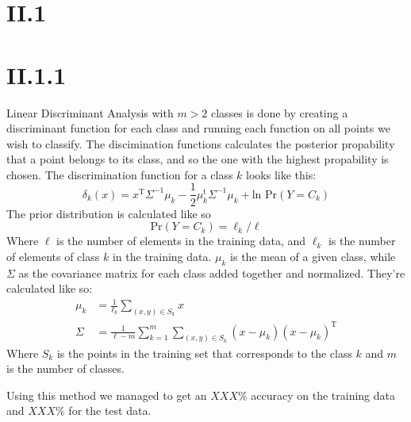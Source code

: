 \section*{II.1}

\section*{II.1.1}
Linear Discriminant Analysis with $m>2$ classes is done by creating a
discriminant function for each class and running each function on all points we
wish to classify. The discimination functions calculates the posterior
propability that a point belongs to its class, and so the one with the highest
propability is chosen.
The discrimination function for a class $k$ looks like this:
\[
  \delta_k(x) = x^\text{T}\Sigma^{-1}\mu_k - \frac{1}{2}\mu^{\text{t}}_k\Sigma^{-1}\mu_k + \text{ln Pr}(Y = C_k)
\]
The prior distribution is calculated like so
\[
  \text{Pr}(Y = C_k) = \ell_k / \ell
\]
Where $\ell$ is the number of elements in the training data, and $\ell_k$ is the
number of elements of class $k$ in the training data. $\mu_k$ is the mean of a
given class, while $\Sigma$ as the covariance matrix for each class added
together and normalized. They're calculated like so:
\begin{align*}
  \mu_k  &= \frac{1}{\ell_k}\sum_{(x,y) \in S_k}x \\
  \Sigma &= \frac{1}{\ell - m}\sum_{k=1}^{m}\sum_{(x,y) \in S_k}(x-\mu_k)(x-\mu_k)^{\text{T}}
\end{align*}
Where $S_k$ is the points in the training set that corresponds to the class $k$
and $m$ is the number of classes.

Using this method we managed to get an $XXX\%$ accuracy on the training data and
$XXX\%$ for the test data.

